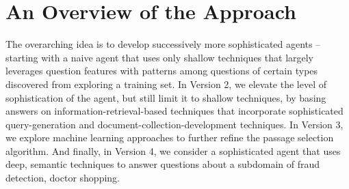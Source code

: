 
%

\section{An Overview of the Approach}

The overarching idea is to develop successively more sophisticated agents -- starting with a naive agent that uses only shallow techniques that largely leverages question features with patterns among questions of certain types discovered from exploring a training set.  In Version 2, we elevate the level of sophistication of the agent, but still limit it to shallow techniques, by basing answers on information-retrieval-based techniques that incorporate sophisticated query-generation and document-collection-development techniques.  In Version 3, we explore machine learning approaches to further refine the passage selection algorithm.  And finally, in Version 4, we consider a sophisticated agent that uses deep, semantic techniques to answer questions about a subdomain of fraud detection, doctor shopping.



